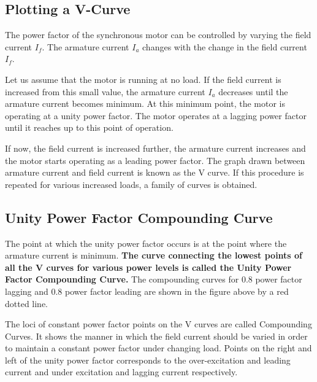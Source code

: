 \documentclass[a4paper,12pt]{article}
\begin{document}
    \subsection{Plotting a V-Curve}
    The power factor of the synchronous motor can be controlled by varying the 
    field current $I_f$. The armature current $I_a$ changes with the change 
    in the field current $I_f$. 
    
    Let us assume that the motor is running at no load. If the field current is increased 
    from this small value, the armature current $I_a$ decreases until the armature current 
    becomes minimum. At this minimum point, the motor is operating at a unity power factor. 
    The motor operates at a lagging power factor until it reaches up to this point of operation.

    If now, the field current is increased further, the armature current increases and 
    the motor starts operating as a leading power factor. 
    The graph drawn between armature current and field current is known as the V curve. 
    If this procedure is repeated for various increased loads, a family of curves is obtained.

    \subsection{Unity Power Factor Compounding Curve}
    The point at which the unity power factor occurs is at the point where the armature 
    current is minimum. {\bf The curve connecting the lowest points of all the V curves 
    for various power levels is called the Unity Power Factor Compounding Curve.}
    The compounding curves for 0.8 power factor lagging and 0.8 power factor leading 
    are shown in the figure above by a red dotted line.

    The loci of constant power factor points on the V curves are called Compounding 
    Curves. It shows the manner in which the field current should be varied in order 
    to maintain a constant power factor under changing load. Points on the right and 
    left of the unity power factor corresponds to the over-excitation and leading 
    current and under excitation and lagging current respectively.

  \pagebreak
\end{document}
